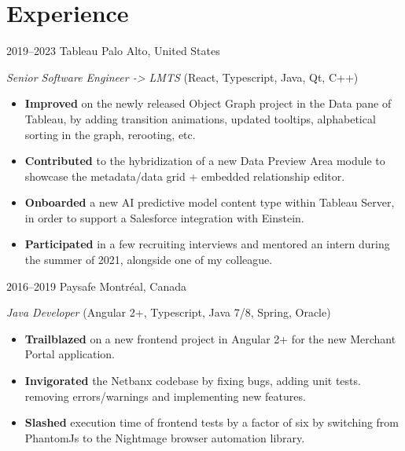 \documentclass[]{friggeri-cv}
\begin{document}
\section{Experience}
\begin{entrylist}

\entry
{2019--2023}
{Tableau}
{Palo Alto, United States}
{\emph{Senior Software Engineer -> LMTS} (React, Typescript, Java, Qt, C++)
\begin{itemize}
	\item \textbf{Improved} on the newly released Object Graph project in the Data pane of Tableau, by adding transition animations, updated tooltips, alphabetical sorting in the graph, rerooting, etc.
	\item \textbf{Contributed} to the hybridization of a new Data Preview Area module to showcase the metadata/data grid + embedded relationship editor. 
	\item \textbf{Onboarded} a new AI predictive model content type within Tableau Server, in order to support a Salesforce integration with Einstein.
	\item \textbf{Participated} in a few recruiting interviews and mentored an intern during the summer of 2021, alongside one of my colleague.
\end{itemize}
}


\entry
{2016--2019}
{Paysafe}
{Montréal, Canada}
{\emph{Java Developer} (Angular 2+, Typescript, Java 7/8, Spring, Oracle)
\begin{itemize}
	\item \textbf{Trailblazed} on a new frontend project in Angular 2+ for the new Merchant Portal application.
	\item \textbf{Invigorated} the Netbanx codebase by fixing bugs, adding unit tests. removing errors/warnings and implementing new features.
	\item \textbf{Slashed} execution time of frontend tests by a factor of six by switching from PhantomJs to the Nightmage browser automation library.
\end{itemize}
}



\end{entrylist}
\end{document}
